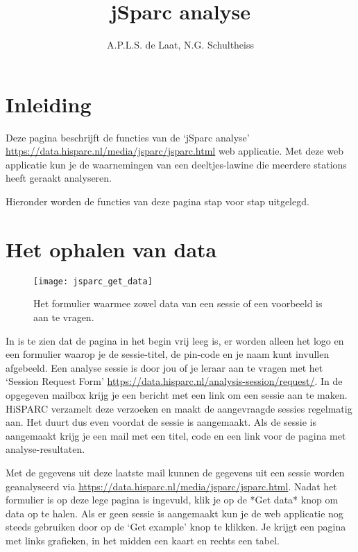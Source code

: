

\title{jSparc analyse}
\author{A.P.L.S. de Laat, N.G. Schultheiss}



\maketitle

\section{Inleiding}

Deze pagina beschrijft de functies van de `jSparc analyse'
\url{https://data.hisparc.nl/media/jsparc/jsparc.html} web
applicatie. Met deze web applicatie kun je de waarnemingen van een
deeltjes-lawine die meerdere stations heeft geraakt analyseren.

Hieronder worden de functies van deze pagina stap voor stap uitgelegd.

\section{Het ophalen van data}

\begin{figure}[H]
    \centering
    \texttt{[image: jsparc\_get\_data]}
    \caption{Het formulier waarmee zowel data van een sessie of een voorbeeld is aan te
   		vragen.}
    \label{fig:get_data}
\end{figure}

In  is te zien dat de pagina in het begin vrij leeg is, er worden alleen het \hisparc logo en een
formulier waarop je de sessie-titel, de pin-code en je naam kunt invullen
afgebeeld. Een analyse sessie is door jou of je leraar aan te vragen met het
`Session Request Form'
\url{https://data.hisparc.nl/analysis-session/request/}. In de opgegeven mailbox krijg je een bericht met een link om een sessie aan te maken. HiSPARC verzamelt deze verzoeken en maakt de aangevraagde sessies regelmatig aan. Het duurt dus even voordat de sessie is aangemaakt. Als de sessie is aangemaakt krijg je een mail met een titel, code en een link voor de pagina met analyse-resultaten.

Met de gegevens uit deze laatste mail kunnen de gegevens uit een sessie worden geanalyseerd via \url{https://data.hisparc.nl/media/jsparc/jsparc.html}. Nadat het formulier is op deze lege pagina is ingevuld, klik je op de *Get data* knop
om data op te halen. Als er geen sessie is aangemaakt kun je de web applicatie
nog steeds gebruiken door op de `Get example' knop te klikken. Je krijgt een pagina met links grafieken, in het midden een kaart en rechts een tabel.

